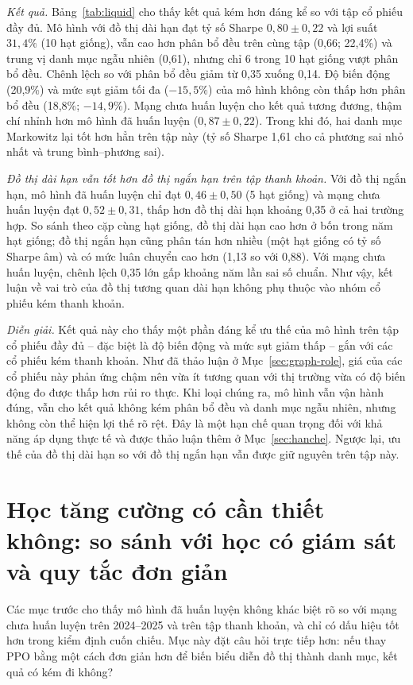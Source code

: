 \textit{Kết quả.} Bảng~\ref{tab:liquid} cho thấy kết quả kém hơn đáng kể so với tập cổ phiếu đầy đủ. Mô hình với đồ thị dài hạn đạt tỷ số Sharpe $0{,}80\pm0{,}22$ và lợi suất $31{,}4\%$ (10 hạt giống), vẫn cao hơn phân bổ đều trên cùng tập (0,66; 22,4\%) và trung vị danh mục ngẫu nhiên (0,61), nhưng chỉ 6 trong 10 hạt giống vượt phân bổ đều. Chênh lệch so với phân bổ đều giảm từ 0,35 xuống 0,14. Độ biến động (20,9\%) và mức sụt giảm tối đa ($-15{,}5\%$) của mô hình không còn thấp hơn phân bổ đều (18,8\%; $-14{,}9\%$). Mạng chưa huấn luyện cho kết quả tương đương, thậm chí nhỉnh hơn mô hình đã huấn luyện ($0{,}87\pm0{,}22$). Trong khi đó, hai danh mục Markowitz lại tốt hơn hẳn trên tập này (tỷ số Sharpe 1,61 cho cả phương sai nhỏ nhất và trung bình--phương sai).

\textit{Đồ thị dài hạn vẫn tốt hơn đồ thị ngắn hạn trên tập thanh khoản.} Với đồ thị ngắn hạn, mô hình đã huấn luyện chỉ đạt $0{,}46\pm0{,}50$ (5 hạt giống) và mạng chưa huấn luyện đạt $0{,}52\pm0{,}31$, thấp hơn đồ thị dài hạn khoảng 0,35 ở cả hai trường hợp. So sánh theo cặp cùng hạt giống, đồ thị dài hạn cao hơn ở bốn trong năm hạt giống; đồ thị ngắn hạn cũng phân tán hơn nhiều (một hạt giống có tỷ số Sharpe âm) và có mức luân chuyển cao hơn (1,13 so với 0,88). Với mạng chưa huấn luyện, chênh lệch 0,35 lớn gấp khoảng năm lần sai số chuẩn. Như vậy, kết luận về vai trò của đồ thị tương quan dài hạn không phụ thuộc vào nhóm cổ phiếu kém thanh khoản.

\textit{Diễn giải.} Kết quả này cho thấy một phần đáng kể ưu thế của mô hình trên tập cổ phiếu đầy đủ -- đặc biệt là độ biến động và mức sụt giảm thấp -- gắn với các cổ phiếu kém thanh khoản. Như đã thảo luận ở Mục~\ref{sec:graph-role}, giá của các cổ phiếu này phản ứng chậm nên vừa ít tương quan với thị trường vừa có độ biến động đo được thấp hơn rủi ro thực. Khi loại chúng ra, mô hình vẫn vận hành đúng, vẫn cho kết quả không kém phân bổ đều và danh mục ngẫu nhiên, nhưng không còn thể hiện lợi thế rõ rệt. Đây là một hạn chế quan trọng đối với khả năng áp dụng thực tế và được thảo luận thêm ở Mục~\ref{sec:hanche}. Ngược lại, ưu thế của đồ thị dài hạn so với đồ thị ngắn hạn vẫn được giữ nguyên trên tập này.

\section{Học tăng cường có cần thiết không: so sánh với học có giám sát và quy tắc đơn giản}
\label{sec:norl}

Các mục trước cho thấy mô hình đã huấn luyện không khác biệt rõ so với mạng chưa huấn luyện trên 2024--2025 và trên tập thanh khoản, và chỉ có dấu hiệu tốt hơn trong kiểm định cuốn chiếu. Mục này đặt câu hỏi trực tiếp hơn: nếu thay PPO bằng một cách đơn giản hơn để biến biểu diễn đồ thị thành danh mục, kết quả có kém đi không?

